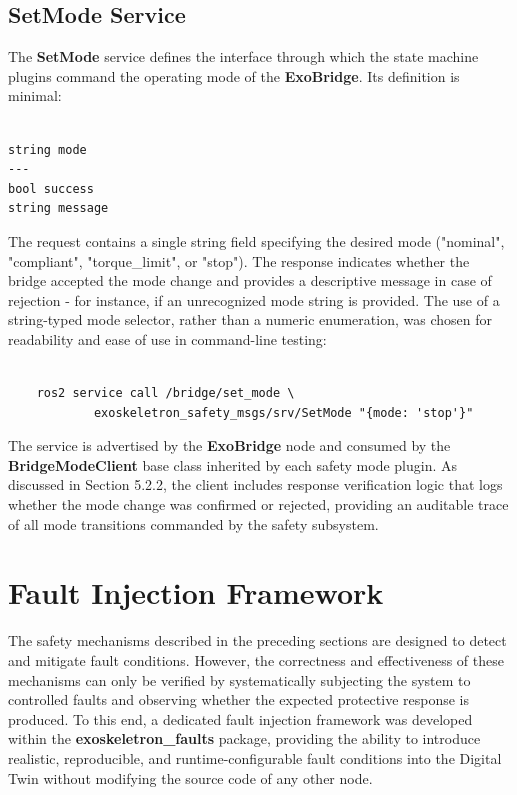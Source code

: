 \subsection{SetMode Service}
The \textbf{SetMode} service defines the interface through which the state machine plugins command the operating mode of the \textbf{ExoBridge}. Its definition is minimal:

\begin{verbatim}

string mode
---
bool success
string message

\end{verbatim}

The request contains a single string field specifying the desired mode ("nominal", "compliant", "torque\_limit", or "stop"). The response indicates whether the bridge accepted the mode change and provides a descriptive message in case of rejection - for instance, if an unrecognized mode string is provided. The use of a string-typed mode selector, rather than a numeric enumeration, was chosen for readability and ease of use in command-line testing:

\begin{verbatim}

    ros2 service call /bridge/set_mode \
            exoskeletron_safety_msgs/srv/SetMode "{mode: 'stop'}"

\end{verbatim}

The service is advertised by the \textbf{ExoBridge} node and consumed by the \textbf{BridgeModeClient} base class inherited by each safety mode plugin. As discussed in Section 5.2.2, the client includes response verification logic that logs whether the mode change was confirmed or rejected, providing an auditable trace of all mode transitions commanded by the safety subsystem.




\section{Fault Injection Framework}
The safety mechanisms described in the preceding sections are designed to detect and mitigate fault conditions. However, the correctness and effectiveness of these mechanisms can only be verified by systematically subjecting the system to controlled faults and observing whether the expected protective response is produced. To this end, a dedicated fault injection framework was developed within the \textbf{exoskeletron\_faults} package, providing the ability to introduce realistic, reproducible, and runtime-configurable fault conditions into the Digital Twin without modifying the source code of any other node.

